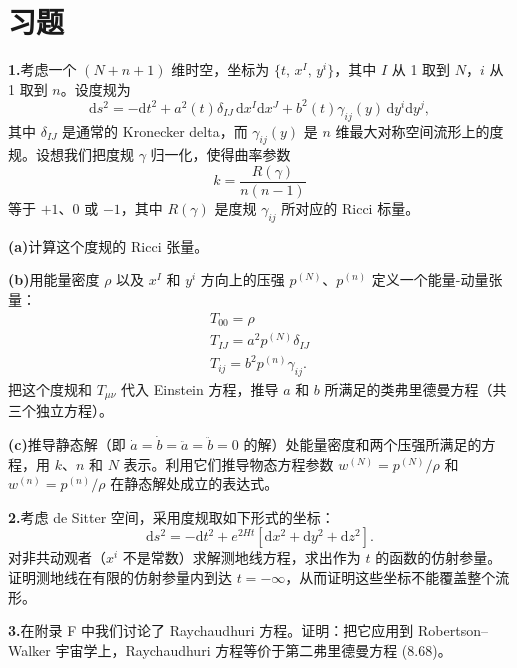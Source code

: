 \section{习题}

\textbf{1.}\quad 考虑一个 $(N+n+1)$ 维时空，坐标为 $\{t,\,x^{I},\,y^{i}\}$，其中 $I$ 从 1 取到 $N$，$i$ 从 1 取到 $n$。设度规为
\begin{equation*}
\mathrm{d}s^{2} = -\mathrm{d}t^{2} + a^{2}(t)\delta_{IJ}\,\mathrm{d}x^{I}\mathrm{d}x^{J} + b^{2}(t)\gamma_{ij}(y)\,\mathrm{d}y^{i}\mathrm{d}y^{j},
\tag{8.213}
\end{equation*}
其中 $\delta_{IJ}$ 是通常的 Kronecker delta，而 $\gamma_{ij}(y)$ 是 $n$ 维最大对称空间流形上的度规。设想我们把度规 $\gamma$ 归一化，使得曲率参数
\begin{equation*}
k = \frac{R(\gamma)}{n(n-1)}
\tag{8.214}
\end{equation*}
等于 $+1$、$0$ 或 $-1$，其中 $R(\gamma)$ 是度规 $\gamma_{ij}$ 所对应的 Ricci 标量。

\textbf{(a)}\quad 计算这个度规的 Ricci 张量。

\textbf{(b)}\quad 用能量密度 $\rho$ 以及 $x^{I}$ 和 $y^{i}$ 方向上的压强 $p^{(N)}$、$p^{(n)}$ 定义一个能量-动量张量：
\begin{gather*}
T_{00} = \rho \tag{8.215}\\
T_{IJ} = a^{2}p^{(N)}\delta_{IJ} \tag{8.216}\\
T_{ij} = b^{2}p^{(n)}\gamma_{ij}. \tag{8.217}
\end{gather*}
把这个度规和 $T_{\mu\nu}$ 代入 Einstein 方程，推导 $a$ 和 $b$ 所满足的类弗里德曼方程（共三个独立方程）。

\textbf{(c)}\quad 推导静态解（即 $\dot{a}=\dot{b}=\ddot{a}=\ddot{b}=0$ 的解）处能量密度和两个压强所满足的方程，用 $k$、$n$ 和 $N$ 表示。利用它们推导物态方程参数 $w^{(N)}=p^{(N)}/\rho$ 和 $w^{(n)}=p^{(n)}/\rho$ 在静态解处成立的表达式。

\textbf{2.}\quad 考虑 de Sitter 空间，采用度规取如下形式的坐标：
\begin{equation*}
\mathrm{d}s^{2} = -\mathrm{d}t^{2} + e^{2Ht}\left[\mathrm{d}x^{2}+\mathrm{d}y^{2}+\mathrm{d}z^{2}\right].
\tag{8.218}
\end{equation*}
对非共动观者（$x^{i}$ 不是常数）求解测地线方程，求出作为 $t$ 的函数的仿射参量。证明测地线在有限的仿射参量内到达 $t=-\infty$，从而证明这些坐标不能覆盖整个流形。

\textbf{3.}\quad 在附录 F 中我们讨论了 Raychaudhuri 方程。证明：把它应用到 Robertson--Walker 宇宙学上，Raychaudhuri 方程等价于第二弗里德曼方程 (8.68)。

